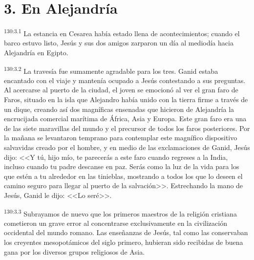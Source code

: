 \section*{3. En Alejandría}
\par 
\textsuperscript{130:3.1} La estancia en Cesarea había estado llena de acontecimientos; cuando el barco estuvo listo, Jesús y sus dos amigos zarparon un día al mediodía hacia Alejandría en Egipto.

\par 
\textsuperscript{130:3.2} La travesía fue sumamente agradable para los tres. Ganid estaba encantado con el viaje y mantenía ocupado a Jesús contestando a sus preguntas. Al acercarse al puerto de la ciudad, el joven se emocionó al ver el gran faro de Faros, situado en la isla que Alejandro había unido con la tierra firme a través de un dique, creando así dos magníficas ensenadas que hicieron de Alejandría la encrucijada comercial marítima de África, Asia y Europa. Este gran faro era una de las siete maravillas del mundo y el precursor de todos los faros posteriores. Por la mañana se levantaron temprano para contemplar este magnífico dispositivo salvavidas creado por el hombre, y en medio de las exclamaciones de Ganid, Jesús dijo: <<Y tú, hijo mío, te parecerás a este faro cuando regreses a la India, incluso cuando tu padre descanse en paz. Serás como la luz de la vida para los que estén a tu alrededor en las tinieblas, mostrando a todos los que lo deseen el camino seguro para llegar al puerto de la salvación>>. Estrechando la mano de Jesús, Ganid le dijo: <<Lo seré>>.

\par 
\textsuperscript{130:3.3} Subrayamos de nuevo que los primeros maestros de la religión cristiana cometieron un grave error al concentrarse exclusivamente en la civilización occidental del mundo romano. Las enseñanzas de Jesús, tal como las conservaban los creyentes mesopotámicos del siglo primero, hubieran sido recibidas de buena gana por los diversos grupos religiosos de Asia.

